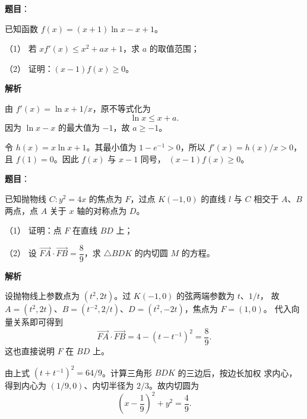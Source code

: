 \begin{answer}

\textbf{题目}：

已知函数 $f(x)=(x+1)\ln x-x+1$。

（1） 若 $xf'(x)\leq x^2+ax+1$，求 $a$ 的取值范围；

（2） 证明：$(x-1)f(x)\geq0$。

\textbf{解析}


由 $f'(x)=\ln x+1/x$，原不等式化为
\nopagebreak[4]
\[
\ln x\leq x+a.
\]
因为 $\ln x-x$ 的最大值为 $-1$，故 $a\geq-1$。


令 $h(x)=x\ln x+1$。其最小值为 $1-e^{-1}>0$，所以
$f'(x)=h(x)/x>0$，且 $f(1)=0$。因此 $f(x)$ 与 $x-1$ 同号，
$(x-1)f(x)\geq0$。



\end{answer}
\begin{answer}

\textbf{题目}：

已知抛物线 $C:y^2=4x$ 的焦点为 $F$，过点 $K(-1,0)$ 的直线 $l$ 与 $C$ 相交于 $A\text{、}B$ 两点，点 $A$ 关于 $x$ 轴的对称点为 $D$。

（1） 证明：点 $F$ 在直线 $BD$ 上；

（2） 设 $\overrightarrow{FA}\cdot\overrightarrow{FB}=\dfrac89$，求 $\triangle BDK$ 的内切圆 $M$ 的方程。

\textbf{解析}


设抛物线上参数点为 $(t^2,2t)$。过 $K(-1,0)$ 的弦两端参数为 $t$、$1/t$，
故 $A=(t^2,2t)$、$B=(t^{-2},2/t)$、$D=(t^2,-2t)$，焦点为 $F=(1,0)$。
代入向量关系即可得到
\nopagebreak[4]
\[
\overrightarrow{FA}\cdot\overrightarrow{FB}=4-(t-t^{-1})^2=\frac89.
\]
这也直接说明 $F$ 在 $BD$ 上。


由上式 $(t+t^{-1})^2=64/9$。计算三角形 $BDK$ 的三边后，按边长加权
求内心，得到内心为 $(1/9,0)$、内切半径为 $2/3$。故内切圆为
\nopagebreak[4]
\[
\left(x-\frac19\right)^2+y^2=\frac49.
\]



\end{answer}
